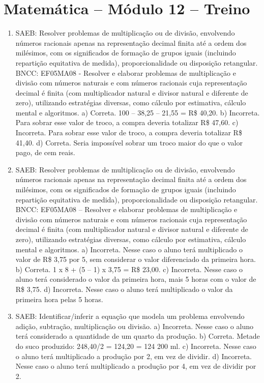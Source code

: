 \section*{Matemática -- Módulo 12 -- Treino}

\begin{enumerate}
\item
SAEB: Resolver problemas de multiplicação ou de divisão, envolvendo números racionais apenas na representação decimal finita até a ordem dos milésimos, com os significados de formação de grupos iguais (incluindo repartição equitativa de medida), proporcionalidade ou disposição retangular.
BNCC: EF05MA08 - Resolver e elaborar problemas de multiplicação e divisão com números naturais e
com números racionais cuja representação decimal é finita (com multiplicador natural e divisor
natural e diferente de zero), utilizando estratégias diversas, como cálculo por estimativa,
cálculo mental e algoritmos.
a) Correta. 100 -- 38,25 -- 21,55 = R\$ 40,20.
b) Incorreta. Para sobrar esse valor de troco, a compra deveria totalizar R\$ 47,60.
c) Incorreta. Para sobrar esse valor de troco, a compra deveria totalizar R\$ 41,40.
d) Correta. Seria impossível sobrar um troco maior do que o valor pago, de cem reais.

\item
SAEB: Resolver problemas de multiplicação ou de divisão, envolvendo números racionais apenas na representação decimal finita até a ordem dos milésimos, com os significados de formação de grupos iguais (incluindo repartição equitativa de medida), proporcionalidade ou disposição retangular.
BNCC: EF05MA08 – Resolver e elaborar problemas de multiplicação e divisão com números naturais e
com números racionais cuja representação decimal é finita (com multiplicador natural e divisor
natural e diferente de zero), utilizando estratégias diversas, como cálculo por estimativa,
cálculo mental e algoritmos.
a) Incorreta. Nesse caso o aluno terá multiplicado o valor de R\$ 3,75 por 5, sem considerar o valor diferenciado da primeira hora.
b) Correta. 1 x 8 + (5 -- 1) x 3,75 = R\$ 23,00.
c) Incorreta. Nesse caso o aluno terá considerado o valor da primeira hora, mais 5 horas com o valor de R\$ 3,75.
d) Incorreta. Nesse caso o aluno terá multiplicado o valor da primeira hora pelas 5 horas.

\item
SAEB: Identificar/inferir a equação que modela um problema
envolvendo adição, subtração, multiplicação ou divisão.
a) Incorreta. Nesse caso o aluno terá considerado a quantidade de um quarto da produção.
b) Correta. Metade do suco produzido: 248,40/2 = 124,20 = 124 200 ml.
c) Incorreta. Nesse caso o aluno terá multiplicado a produção por 2, em vez de dividir.
d) Incorreta. Nesse caso o aluno terá multiplicado a produção por 4, em vez de dividir por 2.
\end{enumerate}

